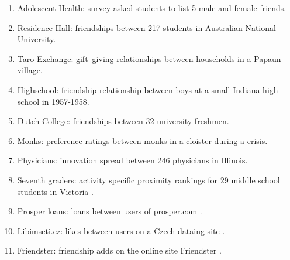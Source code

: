 \documentclass[3p,times]{elsarticle}
\begin{document}
\begin{enumerate}


\begin{enumerate}

    \item Adolescent Health: survey asked students to list 5 male and female friends. \cite{AdHealth}
    
    \item Residence Hall: friendships between 217 students in Australian National University. \cite{Res}
    
    \item Taro Exchange: gift--giving relationships between households in a Papaun village. \cite{Taro}

    \item Highschool: friendship relationship between boys at a small Indiana high school in 1957-1958. \cite{HS}
    
    \item Dutch College: friendships between 32 university freshmen. \cite{Dutch}
    
    \item Monks: preference ratings between monks in a cloister during a crisis. \cite{monks}
    
    \item Physicians: innovation spread between 246 physicians in Illinois. \cite{docs}
    
    \item Seventh graders: activity specific proximity rankings for 29 middle school students in Victoria \cite{sevies}.
    
    \item Prosper loans: loans between users of prosper.com \cite{prosper}.
    
    \item Libimseti.cz: likes between users on a Czech dataing site \cite{libi}.
    
    \item Friendster: friendship adds on the online site Friendster \cite{friendster}.
    

\end{enumerate}
\end{enumerate}
\end{document}
